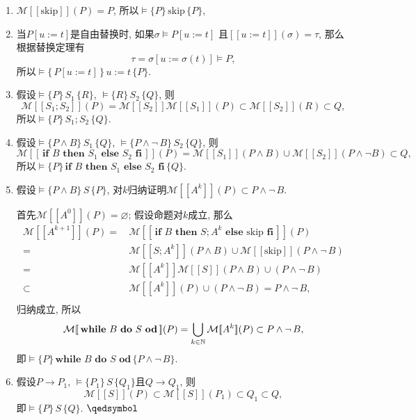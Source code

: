 \documentclass[UTF8]{ctexart}
\begin{document}
\begin{enumerate}
    \item $\mathcal{M}[\![\mathrm{skip}]\!](P)=P$, 所以$\models
    \{P\}\,\mathrm{skip}\,\{P\}$,

    \item 当$P[u:=t]$是自由替换时, 如果$\sigma\models P[u:=t]$
    且$[\![u:=t]\!](\sigma)=\tau$, 那么根据替换定理有
    \[
        \tau=\sigma[u:=\sigma(t)]\models P,
    \]
    所以$\models\{\,P[u:=t]\,\}\,u:=t\,\{P\}$.

    \item 假设$\models\{P\}\,S_1\,\{R\}$, $\models\{R\}\,S_2\,\{Q\}$, 则
    \[
        \mathcal{M}[\![S_1;S_2]\!](P)=\mathcal{M}[\![S_2]\!]
        \mathcal{M}[\![S_1]\!](P)\subset\mathcal{M}[\![S_2]\!](R)\subset Q,
    \]
    所以$\models\{P\}\,S_1;S_2\,\{Q\}$.

    \item 假设$\models\{P\land B\}\,S_1\,\{Q\}$,
    $\models\{P\land\neg\,B\}\,S_2\,\{Q\}$, 则
    \[
        \mathcal{M}[\![\,\mathbf{if}\,\,B\,\,\mathbf{then}\,\,S_1\,\,
        \mathbf{else}\,\,S_2\,\,\mathbf{fi}\,]\!](P)=
        \mathcal{M}[\![S_1]\!](P\land B)\cup
        \mathcal{M}[\![S_2]\!](P\land\neg B)\subset Q,
    \]
    所以$\models\{P\}\,\mathbf{if}\,\,B\,\,\mathbf{then}\,\,S_1\,\,
    \mathbf{else}\,\,S_2\,\,\mathbf{fi}\,\{Q\}$.

    \item 假设$\models\{P\land B\}\,S\,\{P\}$,
    对$k$归纳证明$\mathcal{M}[\![A^k]\!](P)\subset P\land\neg\,B$.

    \hspace{2.17em}
    首先$\mathcal{M}[\![A^0]\!](P)=\varnothing$; 假设命题对$k$成立, 那么
    \vspace{3pt}
    \[\begin{aligned}
        \mathcal{M}[\![A^{k+1}]\!](P)=\,&
        \mathcal{M}[\![\,\mathbf{if}\,\,B\,\,\mathbf{then}\,\,S;A^k\,\,
        \mathbf{else}\,\,\mathrm{skip}\,\,\mathbf{fi}\,]\!](P)\\
        =\,&\mathcal{M}[\![S;A^k]\!](P\land B)\cup
        \mathcal{M}[\![\mathrm{skip}]\!](P\land\neg\,B)\\
        =\,&\mathcal{M}[\![A^k]\!]\mathcal{M}[\![S]\!](P\land B)
        \cup(P\land\neg\,B)\\
        \subset\,&\mathcal{M}[\![A^k]\!](P)\cup(P\land\neg\,B)
        =P\land\neg\,B,\\[3pt]
    \end{aligned}\]
    归纳成立, 所以
    \[
        \mathcal{M}[\![\,\mathbf{while}\,\,B\,\,\mathbf{do}\,\,
        S\,\,\mathbf{od}\,]\!](P)=\bigcup_{k\in\mathbb{N}}\mathcal{M}
        [\![A^k]\!](P)\subset P\land\neg\,B,\\[-5pt]
    \]
    即$\models\{P\}\,\mathbf{while}\,\,B\,\,\mathbf{do}\,\,S
    \,\,\mathbf{od}\,\{P\land\neg\,B\}$.
    
    \item 假设$P\to P_1$, $\models\{P_1\}\,S\,\{Q_1\}$且$Q\to Q_1$, 则
    \[
        \mathcal{M}[\![S]\!](P)\subset\mathcal{M}[\![S]\!](P_1)
        \subset Q_1\subset Q,
    \]
    即$\models\{P\}\,S\,\{Q\}$. \hfill $\qedsymbol$
\end{enumerate}
\end{document}
